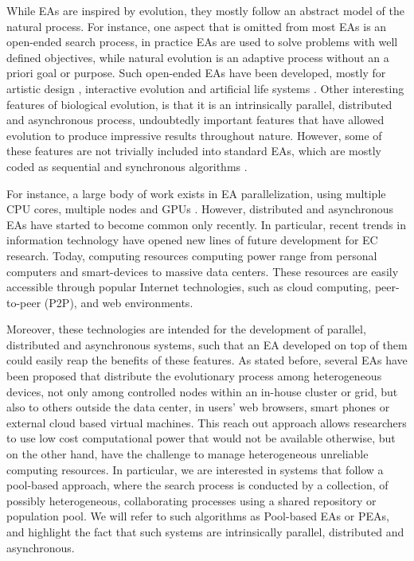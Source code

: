 \documentclass{sig-alternate}
\begin{document}
While EAs are inspired by evolution, they mostly follow an abstract model of the natural process.
For instance, one aspect that is omitted from most EAs is an open-ended search process,
in practice EAs are used to solve problems with well defined objectives, while natural evolution is an adaptive process without an a priori goal or purpose.
Such open-ended EAs have been developed, mostly for artistic design \cite{Musart}, interactive evolution \cite{ie1} and artificial life systems \cite{avida}.
Other interesting features of biological evolution, is that it is an intrinsically parallel, distributed and asynchronous process,
undoubtedly important features that have allowed evolution to produce impressive results throughout nature.
However, some of these features are not trivially included into standard EAs,
which are mostly coded as sequential and synchronous algorithms \cite{eiben}.

For instance, a large body of work exists in EA parallelization, using multiple CPU cores, multiple nodes and GPUs \cite{}.
However, distributed and asynchronous EAs have started to become common only recently.
In particular, recent trends in information technology have opened new lines of future development for EC research.
Today, computing resources computing power range from personal computers and smart-devices to massive data centers.
These resources are easily accessible through popular Internet technologies, such as cloud computing, 
peer-to-peer (P2P), and web environments.

Moreover, these technologies are intended for the development of parallel, distributed and asynchronous systems,
such that an EA developed on top of them could easily reap the benefits of these features.
As stated before, several EAs have been proposed that distribute  the evolutionary process among heterogeneous devices, not only among controlled
nodes within an in-house cluster or grid, but also to others outside the data center, in users' web browsers, smart phones or external cloud based virtual machines.
This reach out approach allows researchers to use low cost computational 
power that would not be available otherwise, but on the other hand, have the 
challenge to manage heterogeneous unreliable computing resources. 
In particular, we are interested in systems that follow a pool-based approach, where the search process is conducted
by a collection, of possibly heterogeneous, collaborating processes using a shared repository or population pool.
We will refer to such algorithms as Pool-based EAs or PEAs, and highlight the fact that such systems are
intrinsically parallel, distributed and asynchronous.
\end{document}
